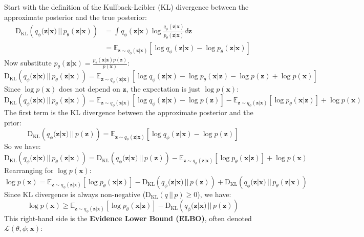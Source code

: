 \documentclass[11pt, letterpaper]{article}
\newcommand{\vx}{\boldsymbol{x}} %
\newcommand{\vz}{\boldsymbol{z}} %
\newcommand{\E}{\mathbb{E}} %
\newcommand{\KL}[2]{\text{D}_{\text{KL}}\left(#1 \,||\, #2\right)} %
\begin{document}
Start with the definition of the Kullback-Leibler (KL) divergence between the approximate posterior and the true posterior:
\begin{align}
    \KL{q_{\phi}(\vz|\vx)}{p_{\theta}(\vz|\vx)} &= \int q_{\phi}(\vz|\vx) \log \frac{q_{\phi}(\vz|\vx)}{p_{\theta}(\vz|\vx)} d\vz \\
    &= \E_{\vz \sim q_{\phi}(\vz|\vx)} \left[ \log q_{\phi}(\vz|\vx) - \log p_{\theta}(\vz|\vx) \right]
\end{align}
Now substitute $p_{\theta}(\vz|\vx) = \frac{p_{\theta}(\vx|\vz) p(\vz)}{p(\vx)}$:
\begin{equation}
    \KL{q_{\phi}(\vz|\vx)}{p_{\theta}(\vz|\vx)} = \E_{\vz \sim q_{\phi}(\vz|\vx)} \left[ \log q_{\phi}(\vz|\vx) - \log p_{\theta}(\vx|\vz) - \log p(\vz) + \log p(\vx) \right]
\end{equation}
Since $\log p(\vx)$ does not depend on $\vz$, the expectation is just $\log p(\vx)$:
\begin{equation}
    \KL{q_{\phi}(\vz|\vx)}{p_{\theta}(\vz|\vx)} = \E_{\vz \sim q_{\phi}(\vz|\vx)} \left[ \log q_{\phi}(\vz|\vx) - \log p(\vz) \right] - \E_{\vz \sim q_{\phi}(\vz|\vx)} \left[ \log p_{\theta}(\vx|\vz) \right] + \log p(\vx)
\end{equation}
The first term is the KL divergence between the approximate posterior and the prior:
\begin{equation}
    \KL{q_{\phi}(\vz|\vx)}{p(\vz)} = \E_{\vz \sim q_{\phi}(\vz|\vx)} \left[ \log q_{\phi}(\vz|\vx) - \log p(\vz) \right]
\end{equation}
So we have:
\begin{equation}
    \KL{q_{\phi}(\vz|\vx)}{p_{\theta}(\vz|\vx)} = \KL{q_{\phi}(\vz|\vx)}{p(\vz)} - \E_{\vz \sim q_{\phi}(\vz|\vx)} \left[ \log p_{\theta}(\vx|\vz) \right] + \log p(\vx)
\end{equation}
Rearranging for $\log p(\vx)$:
\begin{equation}
    \log p(\vx) = \E_{\vz \sim q_{\phi}(\vz|\vx)} \left[ \log p_{\theta}(\vx|\vz) \right] - \KL{q_{\phi}(\vz|\vx)}{p(\vz)} + \KL{q_{\phi}(\vz|\vx)}{p_{\theta}(\vz|\vx)}
\end{equation}
Since KL divergence is always non-negative ($\KL{q}{p} \ge 0$), we have:
\begin{equation}
    \log p(\vx) \ge \E_{\vz \sim q_{\phi}(\vz|\vx)} \left[ \log p_{\theta}(\vx|\vz) \right] - \KL{q_{\phi}(\vz|\vx)}{p(\vz)}
\end{equation}
This right-hand side is the \textbf{Evidence Lower Bound (ELBO)}, often denoted $\mathcal{L}(\theta, \phi; \vx)$:
\end{document}
